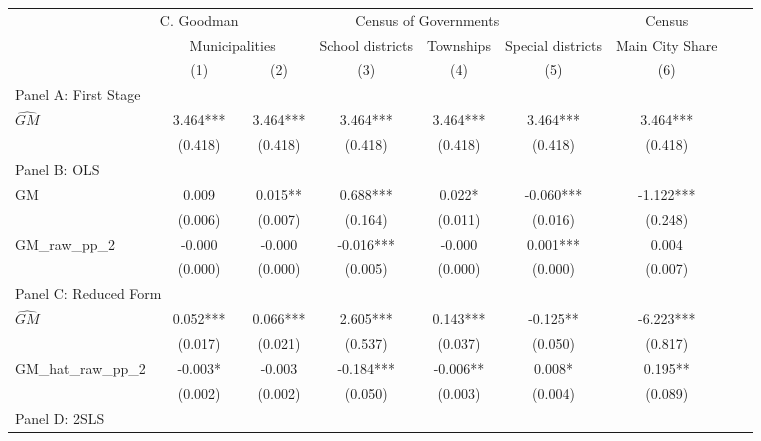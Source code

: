  \begin{tabular}{l*{8}{c}} \toprule
&\multicolumn{1}{c}{C. Goodman}&\multicolumn{4}{c}{Census of Governments}&\multicolumn{1}{c}{Census}\\\cmidrule(lr){2-2}\cmidrule(lr){3-6}\cmidrule(lr){7-7}
&\multicolumn{2}{c}{Municipalities}&\multicolumn{1}{c}{School districts}&\multicolumn{1}{c}{Townships}&\multicolumn{1}{c}{Special districts}&\multicolumn{1}{c}{Main City Share}\\\cmidrule(lr){2-3}\cmidrule(lr){4-6}\cmidrule(lr){7-7}
&\multicolumn{1}{c}{(1)}&\multicolumn{1}{c}{(2)}&\multicolumn{1}{c}{(3)}&\multicolumn{1}{c}{(4)}&\multicolumn{1}{c}{(5)}&\multicolumn{1}{c}{(6)}\\
\cmidrule(lr){1-7}
\multicolumn{6}{l}{Panel A: First Stage}\\
\cmidrule(lr){1-7}
$\widehat{GM}$  &    3.464***&    3.464***&    3.464***&    3.464***&    3.464***&    3.464***\\
                &  (0.418)   &  (0.418)   &  (0.418)   &  (0.418)   &  (0.418)   &  (0.418)   \\
\cmidrule(lr){1-7}
\multicolumn{6}{l}{Panel B: OLS}\\
\cmidrule(lr){1-7}
GM              &    0.009   &    0.015** &    0.688***&    0.022*  &   -0.060***&   -1.122***\\
                &  (0.006)   &  (0.007)   &  (0.164)   &  (0.011)   &  (0.016)   &  (0.248)   \\
\addlinespace
GM\_raw\_pp\_2     &   -0.000   &   -0.000   &   -0.016***&   -0.000   &    0.001***&    0.004   \\
                &  (0.000)   &  (0.000)   &  (0.005)   &  (0.000)   &  (0.000)   &  (0.007)   \\
\cmidrule(lr){1-7}
\multicolumn{6}{l}{Panel C: Reduced Form}\\
\cmidrule(lr){1-7}
$\widehat{GM}$  &    0.052***&    0.066***&    2.605***&    0.143***&   -0.125** &   -6.223***\\
                &  (0.017)   &  (0.021)   &  (0.537)   &  (0.037)   &  (0.050)   &  (0.817)   \\
\addlinespace
GM\_hat\_raw\_pp\_2 &   -0.003*  &   -0.003   &   -0.184***&   -0.006** &    0.008*  &    0.195** \\
                &  (0.002)   &  (0.002)   &  (0.050)   &  (0.003)   &  (0.004)   &  (0.089)   \\
\cmidrule(lr){1-7}
\multicolumn{6}{l}{Panel D: 2SLS}\\
\cmidrule(lr){1-7}

\end{tabular}
